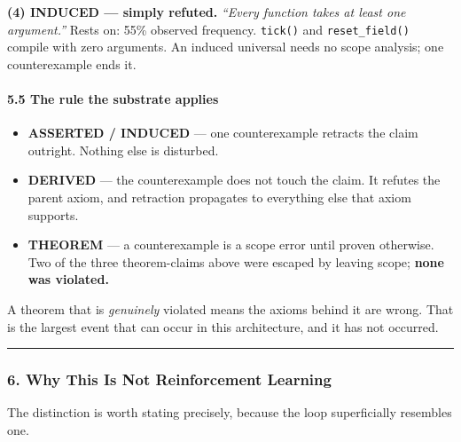 \documentclass[
  11pt,
  a4paper,
]{article}
\providecommand{\tightlist}{%
  \setlength{\itemsep}{0pt}\setlength{\parskip}{0pt}}
\begin{document}
\textbf{(4) INDUCED --- simply refuted.} \emph{``Every function takes at
least one argument.''} Rests on: 55\% observed frequency.
\texttt{tick()} and \texttt{reset\_field()} compile with zero arguments.
An induced universal needs no scope analysis; one counterexample ends
it.

\paragraph{5.5 The rule the substrate
applies}\label{the-rule-the-substrate-applies}

\begin{itemize}
\tightlist
\item
  \textbf{ASSERTED / INDUCED} --- one counterexample retracts the claim
  outright. Nothing else is disturbed.
\item
  \textbf{DERIVED} --- the counterexample does not touch the claim. It
  refutes the parent axiom, and retraction propagates to everything else
  that axiom supports.
\item
  \textbf{THEOREM} --- a counterexample is a scope error until proven
  otherwise. Two of the three theorem-claims above were escaped by
  leaving scope; \textbf{none was violated.}
\end{itemize}

A theorem that is \emph{genuinely} violated means the axioms behind it
are wrong. That is the largest event that can occur in this
architecture, and it has not occurred.

\begin{center}\rule{0.5\linewidth}{0.5pt}\end{center}

\subsubsection{6. Why This Is Not Reinforcement
Learning}\label{why-this-is-not-reinforcement-learning}

The distinction is worth stating precisely, because the loop
superficially resembles one.
\end{document}
